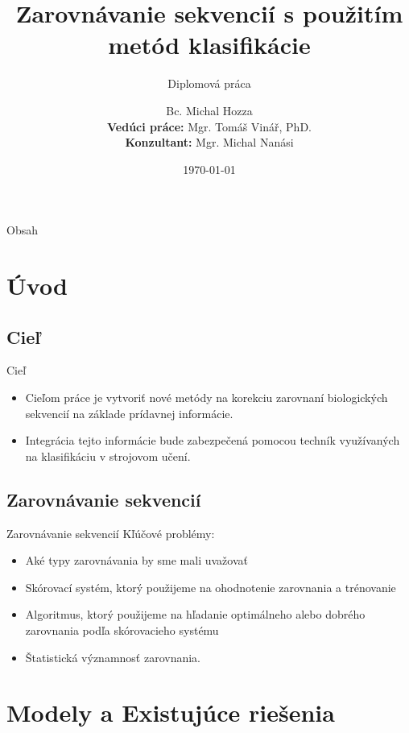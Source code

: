 \documentclass[xcolor=dvipsnames, compress, 12pt]{beamer}
\title{Zarovnávanie sekvencií s použitím metód klasifikácie}
\subtitle{
\vspace{0.5cm}
\small Diplomová práca
}
\author[Michal Hozza]{\small Bc. Michal Hozza \\ \vspace{1cm} \footnotesize \textbf{Vedúci práce:} Mgr. Tomáš Vinář, PhD. \\ \textbf{Konzultant:} Mgr. Michal Nanási\\ \vspace{.5cm}}
\institute[FMFI UK]{
  Fakulta matematiky, fyziky a informatiky,
  Univerzita Komenského, Bratislava\\
}
\date{\footnotesize \today}
\begin{document}
\begin{frame}[plain]
  \titlepage
\end{frame}


\begin{frame}{Obsah}
  \transdissolve[duration=0.1]
  \tableofcontents
\end{frame}


\section{Úvod}
\subsection{Cieľ}
\begin{frame}{Cieľ}
  \begin{itemize}
  \item Cieľom práce je vytvoriť nové metódy na korekciu zarovnaní biologických sekvencií na základe prídavnej informácie.
  \item Integrácia tejto informácie bude zabezpečená pomocou techník využívaných na klasifikáciu v strojovom učení.
  \end{itemize} 
\end{frame}


\subsection{Zarovnávanie sekvencií}
\begin{frame}{Zarovnávanie sekvencií}
Kľúčové problémy:
  \begin{itemize}
    \item Aké typy zarovnávania by sme mali uvažovať
    \item Skórovací systém, ktorý použijeme na ohodnotenie zarovnania a trénovanie
    \item Algoritmus, ktorý použijeme na hľadanie optimálneho alebo dobrého zarovnania podľa skórovacieho systému
    \item Štatistická významnosť zarovnania.
  \end{itemize} 
\end{frame}

\section{Modely a Existujúce riešenia}
\end{document}
